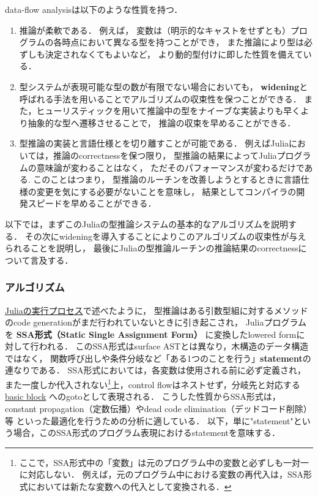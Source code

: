 data-flow analysisは以下のような性質を持つ．

\begin{enumerate}
  \item 推論が柔軟である．
        例えば，
        変数は（明示的なキャストをせずとも）プログラムの各時点において異なる型を持つことができ，
        また推論により型は必ずしも決定されなくてもよいなど，
        より動的型付けに即した性質を備えている．
  \item 型システムが表現可能な型の数が有限でない場合においても，
        \textbf{widening}と呼ばれる手法を用いることでアルゴリズムの収束性を保つことができる．
        また，ヒューリスティックを用いて推論中の型をナイーブな実装よりも早くより抽象的な型へ遷移させることで，
        推論の収束を早めることができる．
  \item 型推論の実装と言語仕様とを切り離すことが可能である．
        例えばJuliaにおいては，推論のcorrectnessを保つ限り，
        型推論の結果によってJuliaプログラムの意味論が変わることはなく，
        ただそのパフォーマンスが変わるだけである.
        このことはつまり，
        型推論のルーチンを改善しようとするときに言語仕様の変更を気にする必要がないことを意味し，
        結果としてコンパイラの開発スピードを早めることができる．
\end{enumerate}

以下では，まずこのJuliaの型推論システムの基本的なアルゴリズムを説明する．
その次にwideningを導入することによりこのアルゴリズムの収束性が与えられることを説明し，
最後にJuliaの型推論ルーチンの推論結果のcorrectnessについて言及する．

\subsubsection{アルゴリズム} \label{subsubsection:inference-algorithm}

\hyperref[subsubsection:eval-process]{Juliaの実行プロセス}で述べたように，
型推論はある引数型組に対するメソッドのcode generationがまだ行われていないときに引き起こされ，
Juliaプログラムを
\textbf{SSA形式（Static Single Assignment Form）}\cite{julia-ssa}
に変換したlowered formに対して行われる．
このSSA形式はsurface ASTとは異なり，木構造のデータ構造ではなく，
関数呼び出しや条件分岐など「ある1つのことを行う」\textbf{statement}の連なりである．
SSA形式においては，各変数は使用される前に必ず定義され，また一度しか代入されない\footnote{
  ここで，SSA形式中の「変数」は元のプログラム中の変数と必ずしも一対一に対応しない．
  例えば，元のプログラム中における変数の再代入は，SSA形式においては新たな変数への代入として変換される．
}上，control flowはネストせず，分岐先と対応する
\href{https://en.wikipedia.org/wiki/Basic_block}{basic block}
へのgotoとして表現される．
こうした性質からSSA形式は，
constant propagation（定数伝播）やdead code elimination（デッドコード削除）等
といった最適化を行うための分析に適している．
以下，単に"statement"という場合，このSSA形式のプログラム表現におけるstatementを意味する．

